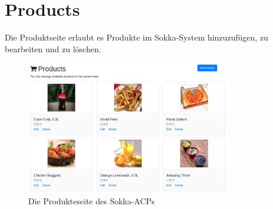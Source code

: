 \section{Products}

Die Produktseite erlaubt es Produkte im Sokka-System hinzuzufügen, zu bearbeiten und zu löschen.

\begin{figure}[ht]
    \centering
    \includegraphics[width=0.8\textwidth]{images/ACP/products.png}
    \caption{Die Produkteseite des Sokka-ACPs}
\end{figure}
